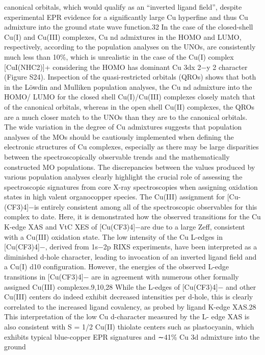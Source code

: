 \documentclass{article}
\begin{document}
canonical orbitals, which would qualify as an “inverted ligand
ﬁeld”, despite experimental EPR evidence for a signiﬁcantly
large Cu hyperﬁne and thus Cu admixture into the ground
state wave function.32 In the case of the closed-shell Cu(I) and
Cu(III) complexes, Cu nd admixtures in the HOMO and
LUMO, respectively, according to the population analyses on
the UNOs, are consistently much less than 10\%, which is
unrealistic in the case of the Cu(I) complex [CuI(NHC2)]+
considering the HOMO has dominant Cu 3dx
2−y
2 character
(Figure S24). Inspection of the quasi-restricted orbitals
(QROs) shows that both in the Löwdin and Mulliken
population analyses, the Cu nd admixture into the HOMO/
LUMO for the closed shell Cu(I)/Cu(III) complexes closely
match that of the canonical orbitals, whereas in the open shell
Cu(II) complexes, the QROs are a much closer match to the
UNOs than they are to the canonical orbitals. The wide
variation in the degree of Cu admixtures suggests that
population analyses of the MOs should be cautiously
implemented when deﬁning the electronic structures of Cu
complexes, especially as there may be large disparities between
the spectroscopically observable trends and the mathematically
constructed MO populations.
The discrepancies between the values produced by various
population analyses clearly highlight the crucial role of
assessing the spectroscopic signatures from core X-ray
spectroscopies when assigning oxidation states in high valent
organocopper species. The Cu(III) assignment for [Cu-
(CF3)4]−is entirely consistent among all of the spectroscopic
observables for this complex to date. Here, it is demonstrated
how the observed transitions for the Cu K-edge XAS and VtC
XES of [Cu(CF3)4]−are due to a large Zeff, consistent with a
Cu(III) oxidation state.
The low intensity of the Cu L-edges in [Cu(CF3)4]−,
derived from 1s−2p RIXS experiments, have been interpreted
as a diminished d-hole character, leading to invocation of an
inverted ligand ﬁeld and a Cu(I) d10 conﬁguration. However,
the energies of the observed L-edge transitions in [Cu(CF3)4]−
are in agreement with numerous other formally assigned
Cu(III) complexes.9,10,28 While the L-edges of [Cu(CF3)4]−
and other Cu(III) centers do indeed exhibit decreased
intensities per d-hole, this is clearly correlated to the increased
ligand covalency, as probed by ligand K-edge XAS.28 This
interpretation of the low Cu d-character measured by the L-
edge XAS is also consistent with S = 1/2 Cu(II) thiolate
centers such as plastocyanin, which exhibits typical blue-copper
EPR signatures and ∼41\% Cu 3d admixture into the ground
\end{document}
